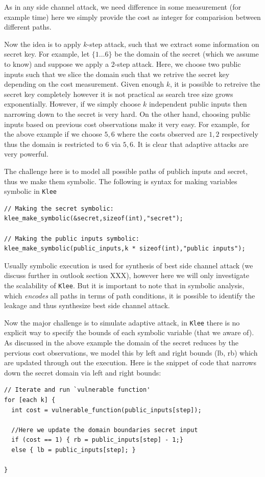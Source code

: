 \documentclass[11pt,a4paper,notitlepage]{article}
\begin{document}
As in any side channel attack, we need difference in some measurement (for example time) here we simply provide the cost as integer
for comparision between different paths.

Now the idea is to apply $k$-step attack, such that we extract some information on secret key.
For example, let $\{1 \dots 6\}$ be the domain of the secret (which we assume to know) and suppose we apply a $2$-step attack.
Here, we choose two public inputs such that we slice the domain such that we retrive the secret key depending on the cost measurement.
Given enough $k$, it is possible to retreive the secret key completely however it is not practical as search tree size grows exponentially.
However, if we simply choose $k$ independent public inputs then narrowing down to the secret is very hard.
On the other hand, choosing public inputs based on previous cost observations make it very easy.
For example, for the above example if we choose ${5,6}$ where the costs observed are ${1,2}$ respectively thus the domain is restricted to ${6}$ via ${5,6}$. It is clear that adaptive attacks are very powerful.

The challenge here is to model all possible paths of publich inputs and secret, thus we make them symbolic.
The following is syntax for making variables symbolic in \texttt{Klee}
\begin{verbatim}
// Making the secret symbolic:
klee_make_symbolic(&secret,sizeof(int),"secret");

// Making the public inputs symbolic:
klee_make_symbolic(public_inputs,k * sizeof(int),"public inputs");
\end{verbatim}

Usually symbolic execution is used for synthesis of best side channel attack (we discuss further in outlook section XXX), however here we will only investigate the scalability of \texttt{Klee}.
But it is important to note that in symbolic analysis, which \emph{encodes} all paths in terms of path conditions, it is possible to identify the leakage and thus synthesize best side channel attack.

Now the major challenge is to simulate adaptive attack, in \texttt{Klee} there is no explicit way to specify the bounds of each symbolic variable (that we aware of).
As discussed in the above example the domain of the secret reduces by the pervious cost observations, we model this by left and right bounds (lb, rb) which are updated through out the execution.
Here is the snippet of code that narrows down the secret domain via left and right bounds:
\begin{verbatim}
// Iterate and run `vulnerable function'
for [each k] {
  int cost = vulnerable_function(public_inputs[step]);

  //Here we update the domain boundaries secret input
  if (cost == 1) { rb = public_inputs[step] - 1;}
  else { lb = public_inputs[step]; }

}
\end{verbatim}
\end{document}
